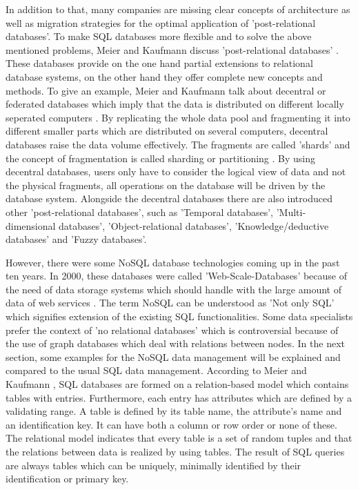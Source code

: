 In addition to that, many companies are missing clear concepts of architecture as well as migration strategies for the optimal application of  'post-relational databases'. To make SQL databases more flexible and to solve the above mentioned problems, Meier and Kaufmann discuss 'post-relational databases' \cite[p.187 ff.]{nosql_meier}. These databases provide on the one hand partial extensions to relational database systems, on the other hand they offer complete new concepts and methods. To give an example, Meier and Kaufmann talk about decentral or federated databases which imply that the data is distributed on different locally seperated computers \cite[p.188 ff.]{nosql_meier}. By replicating the whole data pool and fragmenting it into different smaller parts which are distributed on several computers, decentral databases raise the data volume effectively. The fragments are called 'shards' and the concept of fragmentation is called sharding or partitioning \cite[p.188 ff.]{nosql_meier}. By using decentral databases, users only have to consider the logical view of data and not the physical fragments, all operations on the database will be driven by the database system.  
Alongside the decentral databases there are also introduced other 'post-relational databases', such as 'Temporal databases', 'Multi-dimensional databases', 'Object-relational databases', 'Knowledge/deductive databases' and 'Fuzzy databases'.

However, there were some NoSQL database technologies coming up in the past ten years. In 2000, these databases were called 'Web-Scale-Databases' because of the need of data storage systems which should handle with the large amount of data of web services \cite[p.221 ff.]{nosql_meier}.
The term NoSQL can be understood as 'Not only SQL' which signifies extension of the existing SQL functionalities. Some data specialists prefer the context of 'no relational databases' which is controversial because of the use of graph databases which deal with relations between nodes.   
In the next section, some examples for the NoSQL data management will be explained and compared to the usual SQL data management. According to Meier and Kaufmann \cite[p.3 ff.]{nosql_meier}, SQL databases are formed on a relation-based model which contains tables with entries. Furthermore, each entry has attributes which are defined by a validating range. A table is defined by its table name, the attribute's name and an identification key. It can have both a column or row order or none of these. The relational model indicates that every table is a set of random tuples and that the relations between data is realized by using tables. The result of SQL queries are always tables which can be uniquely, minimally identified by their identification or primary key.


